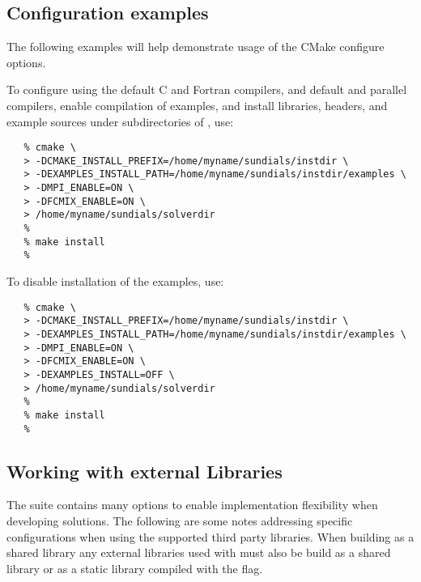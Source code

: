 
\subsection{Configuration examples}

The following examples will help demonstrate usage of the CMake configure options.

\noindent To configure {\sundials} using the default C and Fortran compilers,
and default  and  parallel compilers,
enable compilation of examples, and install libraries, headers, and
example sources under subdirectories of
, use:

\begin{verbatim}
   % cmake \
   > -DCMAKE_INSTALL_PREFIX=/home/myname/sundials/instdir \
   > -DEXAMPLES_INSTALL_PATH=/home/myname/sundials/instdir/examples \
   > -DMPI_ENABLE=ON \
   > -DFCMIX_ENABLE=ON \
   > /home/myname/sundials/solverdir
   %
   % make install
   %
\end{verbatim}

\noindent To disable installation of the examples, use:
\begin{verbatim}
   % cmake \
   > -DCMAKE_INSTALL_PREFIX=/home/myname/sundials/instdir \
   > -DEXAMPLES_INSTALL_PATH=/home/myname/sundials/instdir/examples \
   > -DMPI_ENABLE=ON \
   > -DFCMIX_ENABLE=ON \
   > -DEXAMPLES_INSTALL=OFF \
   > /home/myname/sundials/solverdir
   %
   % make install
   %
\end{verbatim}

\subsection{Working with external Libraries} \label{ss:externallibs}

The {\sundials} suite contains many options to enable implementation flexibility
when developing solutions. The following are some notes addressing specific configurations
when using the supported third party libraries.
When building {\sundials} as a shared library any external libraries
used with {\sundials} must also be build as a shared library or as a
static library compiled with the  flag.{\warn}

